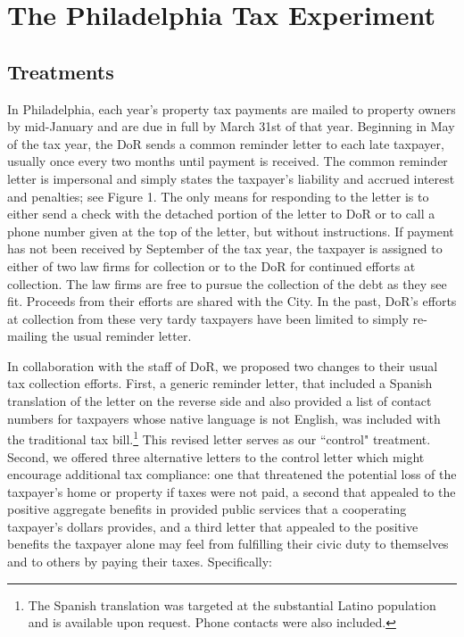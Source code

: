 \documentclass[12pt,titlepage]{article}
\begin{document}
\section{The Philadelphia Tax Experiment}

\subsection{Treatments}

In Philadelphia, each year's property tax payments are mailed to
property owners by mid-January and are due in full by March 31st of
that year.  Beginning in May of the tax year, the DoR sends a common
reminder letter to each late taxpayer, usually once every two months
until payment is received.  The common reminder letter is impersonal
and simply states the taxpayer's liability and accrued interest and
penalties; see Figure 1.  The only means for responding to the letter
is to either send a check with the detached portion of the letter to
DoR or to call a phone number given at the top of the letter, but
without instructions.  If payment has not been received by September
of the tax year, the taxpayer is assigned
to either of two law firms for collection or to the DoR
for continued efforts at collection.  The law firms are free to pursue
the collection of the debt as they see fit.  Proceeds from their
efforts are shared with the City.  In the past, DoR's efforts at
collection from these very tardy taxpayers have been limited to simply
re-mailing the usual reminder letter.

In collaboration with the staff of DoR, we proposed two changes to
their usual tax collection efforts.  First, a generic reminder letter,
that included a Spanish translation of the letter on the reverse side
and also provided a list of contact numbers for taxpayers whose
native language is not English, was included with the traditional tax
bill.\footnote{The Spanish translation was targeted at the substantial Latino
population and is available upon request. Phone contacts were also included.}  This revised
letter serves as our ``control" treatment.  Second, we offered three
alternative letters to the control letter which might encourage
additional tax compliance: one that threatened the potential loss of
the taxpayer's home or property if taxes were not paid, a second that
appealed to the positive aggregate benefits in provided public
services that a cooperating taxpayer's dollars provides, and a third 
letter that appealed to the positive benefits the taxpayer alone 
may feel from fulfilling their civic duty to themselves and to others 
by paying their taxes. Specifically:
\end{document}
